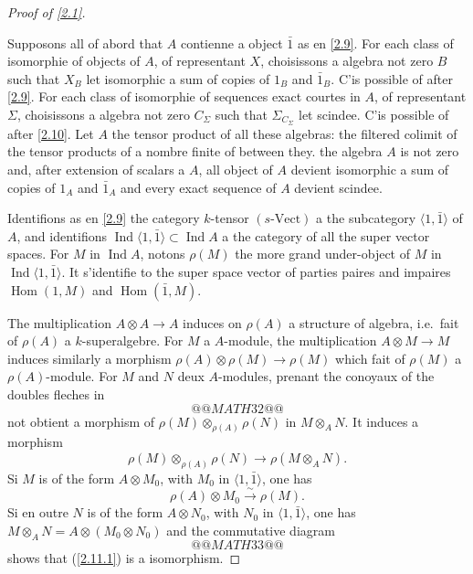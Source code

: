 \documentclass[11pt,a4paper]{article}
\theoremstyle{plain}
\theoremstyle{definition}
\DeclareMathOperator{\Hom}{Hom}
\DeclareMathOperator{\Ind}{Ind}
\newcommand{\Vect}{\mathrm{Vect}}
\begin{document}
\begin{proof}[Proof of \ref{2.1}]\label{2.11}

Supposons all of abord that $A$ contienne a object $\bar{1}$ as en \ref{2.9}. For each class of isomorphie of objects of $A$, of representant $X$, choisissons a algebra not zero $B$ such that $X_B$ let isomorphic a sum of copies of $1_B$ and $\bar{1}_B$. C'is possible of after \ref{2.9}. For each class of isomorphie of sequences exact courtes in $A$, of representant $\Sigma$, choisissons a algebra not zero $C_\Sigma$ such that $\Sigma_{C_\Sigma}$ let scindee. C'is possible of after \ref{2.10}. Let $A$ the tensor product of all these algebras: the filtered colimit of the tensor products of a nombre finite of between they. the algebra $A$ is not zero and, after extension of scalars a $A$, all object of $A$ devient isomorphic a sum of copies of $1_A$ and $\bar{1}_A$ and every exact sequence of $A$ devient scindee.

Identifions as en \ref{2.9} the category $k$-tensor $(s\text{-}\Vect)$ a the subcategory $\langle1,\bar{1}\rangle$ of $A$, and identifions $\Ind\langle1,\bar{1}\rangle\subset\Ind A$ a the category of all the super vector spaces. For $M$ in $\Ind A$, notons $\rho(M)$ the more grand under-object of $M$ in $\Ind\langle1,\bar{1}\rangle$. It s'identifie to the super space vector of parties paires and impaires $\Hom(1,M)$ and $\Hom(\bar{1},M)$.

The multiplication $A\otimes A\to A$ induces on $\rho(A)$ a structure of algebra, i.e.~fait of $\rho(A)$ a $k$-superalgebre. For $M$ a $A$-module, the multiplication $A\otimes M\to M$ induces similarly a morphism $\rho(A)\otimes\rho(M)\to\rho(M)$ which fait of $\rho(M)$ a $\rho(A)$-module. For $M$ and $N$ deux $A$-modules, prenant the conoyaux of the doubles fleches in
\[
@@MATH32@@
\]
not obtient a morphism of $\rho(M)\otimes_{\rho(A)}\rho(N)$ in $M\otimes_A N$. It induces a morphism
\begin{equation}\label{2.11.1}
\rho(M)\otimes_{\rho(A)}\rho(N)\to\rho(M\otimes_A N).
\end{equation}
Si $M$ is of the form $A\otimes M_0$, with $M_0$ in $\langle1,\bar{1}\rangle$, one has
\begin{equation}\label{2.11.2}
\rho(A)\otimes M_0\xrightarrow{\sim}\rho(M).
\end{equation}
Si en outre $N$ is of the form $A\otimes N_0$, with $N_0$ in $\langle1,\bar{1}\rangle$, one has $M\otimes_A N=A\otimes(M_0\otimes N_0)$ and the commutative diagram
\[
@@MATH33@@
\]
shows that (\ref{2.11.1}) is a isomorphism.


\end{proof}
\end{document}
